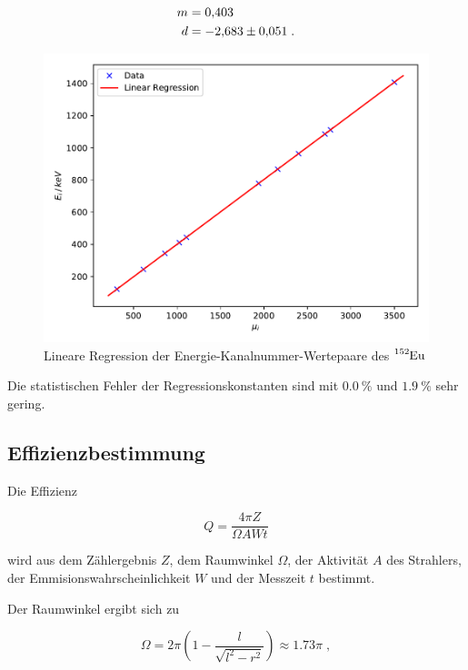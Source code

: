 \begin{align*}
  m &= \num{0.403 +- 0.000} \\
  d &= \num{-2.683 +- 0.051} \; .
\end{align*}

\begin{figure}
  \centering
  \includegraphics{content/plot5.pdf}
  \caption{Lineare Regression der Energie-Kanalnummer-Wertepaare des $\ce{^{152}Eu}$}
  \label{fig:plot5}
\end{figure}

Die statistischen Fehler der Regressionskonstanten sind mit $\SI{0.0}{\percent}$ und $\SI{1.9}{\percent}$ sehr gering.


\subsection{Effizienzbestimmung}

Die Effizienz

\begin{equation}
  Q = \frac{4 \pi Z}{\Omega A W t}
\end{equation}

wird aus dem Zählergebnis $Z$, dem Raumwinkel $\Omega$, der Aktivität $A$ des Strahlers, 
der Emmisionswahrscheinlichkeit $W$ und der Messzeit $t$ bestimmt.

Der Raumwinkel ergibt sich zu 

\begin{equation}
  \Omega = 2 \pi \left(1 - \frac{l}{\sqrt{l^2 - r^2}}\right) \approx \num{1.73} \pi \; ,
\end{equation} 


